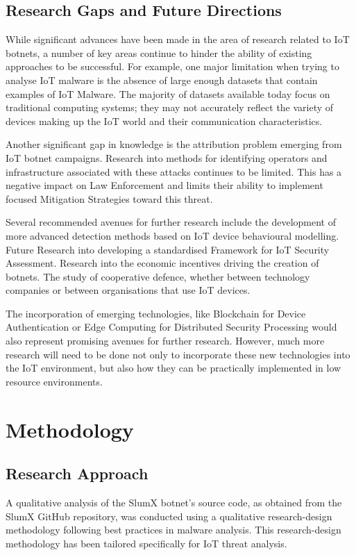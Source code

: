 \documentclass[12pt,letterpaper]{report}
\begin{document}
\section{Research Gaps and Future Directions}

While significant advances have been made in the area of research related to IoT botnets, a number of key areas continue to hinder the ability of existing approaches to be successful. For example, one major limitation when trying to analyse IoT malware is the absence of large enough datasets that contain examples of IoT Malware. The majority of datasets available today focus on traditional computing systems; they may not accurately reflect the variety of devices making up the IoT world and their communication characteristics.

Another significant gap in knowledge is the attribution problem emerging from IoT botnet campaigns. Research into methods for identifying operators and infrastructure associated with these attacks continues to be limited. This has a negative impact on Law Enforcement and limits their ability to implement focused Mitigation Strategies toward this threat.

Several recommended avenues for further research include the development of more advanced detection methods based on IoT device behavioural modelling. Future Research into developing a standardised Framework for IoT Security Assessment. Research into the economic incentives driving the creation of botnets. The study of cooperative defence, whether between technology companies or between organisations that use IoT devices.

The incorporation of emerging technologies, like Blockchain for Device Authentication or Edge Computing for Distributed Security Processing would also represent promising avenues for further research. However, much more research will need to be done not only to incorporate these new technologies into the IoT environment, but also how they can be practically implemented in low resource environments.

\chapter{Methodology}

\section{Research Approach}
A qualitative analysis of the SlumX botnet's source code, as obtained from the SlumX GitHub repository, was conducted using a qualitative research-design methodology following best practices in malware analysis. This research-design methodology has been tailored specifically for IoT threat analysis.
\end{document}
